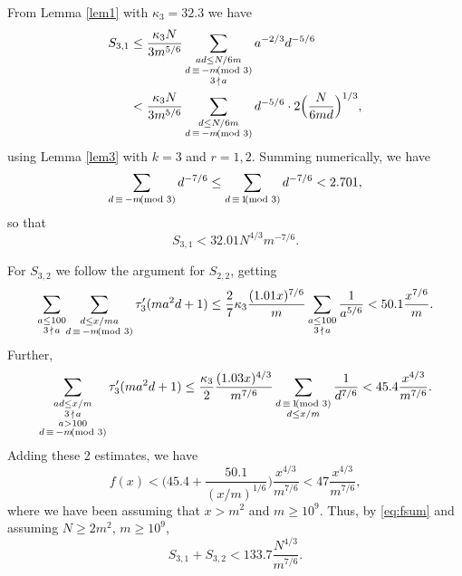 \documentclass[12pt]{amsart}
\theoremstyle{definition}
\theoremstyle{remark}
\numberwithin{equation}{section}
\begin{document}
 From Lemma \ref{lem1} with $\kappa_3=32.3$ we have
 \begin{align*}
 S_{3,1}&\le\frac{\kappa_3 N}{3m^{5/6}}\sum_{\substack{ad\le N/6m\\d\,\equiv\,-m\kern-5pt\pmod3\\3\,\nmid\, a}}
 a^{-2/3}d^{-5/6}\\
& <\frac{\kappa_3 N}{3m^{5/6}}\sum_{\substack{d\le N/6m\\d\,\equiv\,-m\kern-5pt\pmod3}}
 d^{-5/6}\cdot2\Big(\frac{N}{6md}\Big)^{1/3},
 \end{align*}
 using Lemma \ref{lem3} with $k=3$ and $r=1,2$.  Summing numerically, we have
 \[
 \sum_{d\,\equiv\,-m\kern-5pt\pmod3}d^{-7/6}
 \le \sum_{d\,\equiv\,1\kern-5pt\pmod 3}d^{-7/6}<2.701,
 \]
so that 
\[
S_{3,1}<32.01N^{4/3}m^{-7/6}.
\]

For $S_{3,2}$ we follow the argument for $S_{2,2}$, getting
\[
\sum_{\substack{a\le100\\3\,\nmid\,a}}\kern-2pt\sum_{\substack{d\le x/ma\\d\,\equiv\,-m\kern-5pt\pmod3}}
\tau'_3(ma^2d+1)\le\frac27\kappa_3\frac{(1.01x)^{7/6}}{m}\sum_{\substack{a\le100\\3\,\nmid\,a}}\frac1{a^{5/6}}<50.1\frac{x^{7/6}}m.
\]
Further,
\[
\sum_{\substack{ad\le x/m\\3\,\nmid\,a\\a>100\\d\,\equiv\,-m\kern-5pt\pmod3}}\tau'_3(ma^2d+1)
\le\frac{\kappa_3}{2}\frac{(1.03x)^{4/3}}{m^{7/6}}
\sum_{\substack{d\,\equiv\,1\kern-5pt\pmod3\\d\le x/m}}\frac1{d^{7/6}}<45.4\frac{x^{4/3}}{m^{7/6}}.
\]
Adding these 2 estimates, we have 
\[
f(x)<\Big(45.4+\frac{50.1}{(x/m)^{1/6}}\Big)\frac{x^{4/3}}{m^{7/6}}<47\frac{x^{4/3}}{m^{7/6}},
\]
where we have been assuming that $x>m^2$ and $m\ge10^9$.  Thus, by \eqref{eq:fsum}
and assuming $N\ge2m^2$, $m\ge10^9$,
\[
S_{3,1}+S_{3,2}<133.7\frac{N^{4/3}}{m^{7/6}}.
\]
\end{document}
